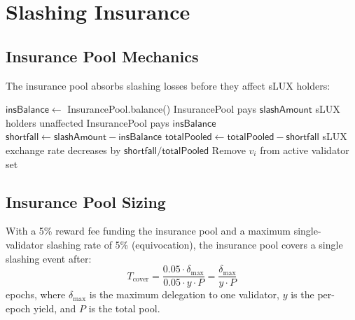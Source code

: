\section{Slashing Insurance}
\label{sec:insurance}

\subsection{Insurance Pool Mechanics}

The insurance pool absorbs slashing losses before they affect sLUX holders:

\begin{algorithm}[H]
\caption{Slashing Loss Absorption}
\label{alg:insurance}
\begin{algorithmic}[1]
    \State $\mathsf{insBalance} \gets$ InsurancePool.balance()
        \State InsurancePool pays $\mathsf{slashAmount}$ 
        \State sLUX holders unaffected
    \Else
        \State InsurancePool pays $\mathsf{insBalance}$
        \State $\mathsf{shortfall} \gets \mathsf{slashAmount} - \mathsf{insBalance}$
        \State $\mathsf{totalPooled} \gets \mathsf{totalPooled} - \mathsf{shortfall}$ 
        \State sLUX exchange rate decreases by $\mathsf{shortfall}/\mathsf{totalPooled}$
    \EndIf
    \State Remove $v_i$ from active validator set
\EndProcedure
\end{algorithmic}
\end{algorithm}

\subsection{Insurance Pool Sizing}

\begin{proposition}
With a 5\% reward fee funding the insurance pool and a maximum single-validator slashing rate of 5\% (equivocation), the insurance pool covers a single slashing event after:
\begin{equation}
    T_{\text{cover}} = \frac{0.05 \cdot \delta_{\max}}{0.05 \cdot y \cdot P} = \frac{\delta_{\max}}{y \cdot P}
\end{equation}
epochs, where $\delta_{\max}$ is the maximum delegation to one validator, $y$ is the per-epoch yield, and $P$ is the total pool.
\end{proposition}

